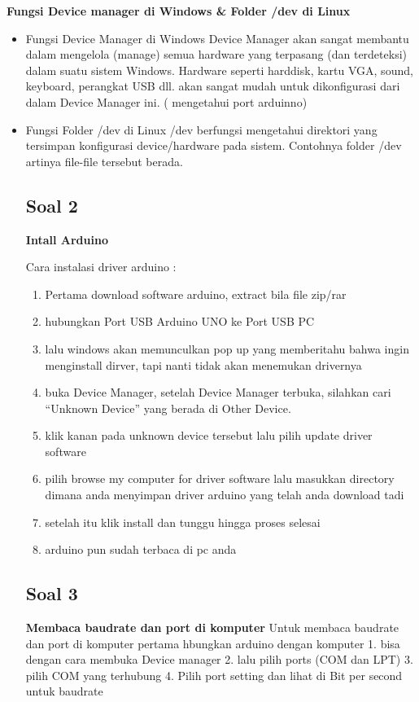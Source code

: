 \textbf{Fungsi Device manager di Windows & Folder /dev di Linux}
\begin{itemize}
\item Fungsi Device Manager di Windows
	Device Manager akan sangat membantu dalam mengelola (manage) semua hardware yang terpasang (dan terdeteksi) dalam suatu sistem Windows. Hardware seperti harddisk, kartu VGA, sound, keyboard, perangkat USB dll. akan sangat mudah untuk dikonfigurasi dari dalam Device Manager ini. ( mengetahui port arduinno)

\item Fungsi Folder /dev di Linux
/dev berfungsi mengetahui  direktori yang tersimpan konfigurasi device/hardware pada sistem. Contohnya folder /dev artinya file-file tersebut berada.

	
\subsection{Soal 2}	
\textbf{Intall Arduino}

Cara instalasi driver arduino :
		\begin{enumerate}
			\item Pertama download software arduino, extract bila file zip/rar
			\item hubungkan Port USB Arduino UNO ke Port USB PC
			\item lalu windows akan memunculkan pop up yang memberitahu bahwa ingin menginstall dirver, tapi nanti tidak akan menemukan drivernya
			\item buka Device Manager, setelah Device Manager terbuka, silahkan cari “Unknown Device” yang berada di Other Device.
			\item klik kanan pada unknown device tersebut lalu pilih update driver software
			\item pilih browse my computer for driver software lalu masukkan directory dimana anda menyimpan driver arduino yang telah anda download tadi
			\item setelah itu klik install dan tunggu hingga proses selesai
			\item arduino pun sudah terbaca di pc anda 
		\end{enumerate}


\subsection{Soal 3}

\textbf{Membaca baudrate dan port di komputer}
Untuk membaca baudrate dan port di komputer pertama hbungkan arduino dengan komputer
1. bisa dengan cara membuka Device manager
2. lalu pilih ports (COM  dan LPT)
3. pilih COM yang terhubung
4. Pilih port setting dan lihat di Bit per second untuk baudrate


\end{itemize}
